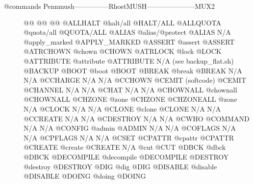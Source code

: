 \documentclass[letterpaper,10pt,english]{sphinxmanual}
\begin{document}
\begin{description}
\item[{@commands Pennmush—————\sphinxhyphen{}RhostMUSH———————\sphinxhyphen{}MUX2}] \leavevmode
\sphinxAtStartPar
@@                      @@                             @@
@ALLHALT                @halt/all                      @HALT/ALL
@ALLQUOTA               @quota/all                     @QUOTA/ALL
@ALIAS                  @alias/@protect                @ALIAS
N/A                     @apply\_marked                  @APPLY\_MARKED
@ASSERT                 @assert                        @ASSERT
@ATRCHOWN               @chown                         @CHOWN
@ATRLOCK                @lock                          @LOCK
@ATTRIBUTE              @attribute                     @ATTRIBUTE
N/A                     (see backup\_flat.sh)           @BACKUP
@BOOT                   @boot                          @BOOT
@BREAK                  @break                         @BREAK
N/A                     N/A                            @CCHARGE
N/A                     N/A                            @CCHOWN
@CEMIT                  (softcode)                     @CEMIT
@CHANNEL                N/A                            N/A
@CHAT                   N/A                            N/A
@CHOWNALL               @chownall                      @CHOWNALL
@CHZONE                 @zone                          @CHZONE
@CHZONEALL              @zone                          N/A
@CLOCK                  N/A                            N/A
@CLONE                  @clone                         @CLONE
N/A                     N/A                            @CCREATE
N/A                     N/A                            @CDESTROY
N/A                     N/A                            @CWHO
@COMMAND                N/A                            N/A
@CONFIG                 @admin                         @ADMIN
N/A                     N/A                            @COFLAGS
N/A                     N/A                            @CPFLAGS
N/A                     N/A                            @CSET
@CPATTR                 @cpattr                        @CPATTR
@CREATE                 @create                        @CREATE
N/A                     @cut                           @CUT
@DBCK                   @dbck                          @DBCK
@DECOMPILE              @decompile                     @DECOMPILE
@DESTROY                @destroy                       @DESTROY
@DIG                    @dig                           @DIG
@DISABLE                @disable                       @DISABLE
@DOING                  @doing                         @DOING

\end{description}
\end{document}
